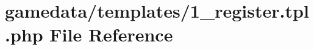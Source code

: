 \hypertarget{1__register_8tpl_8php}{\section{gamedata/templates/1\+\_\+register.tpl.\+php File Reference}
\label{1__register_8tpl_8php}
}

